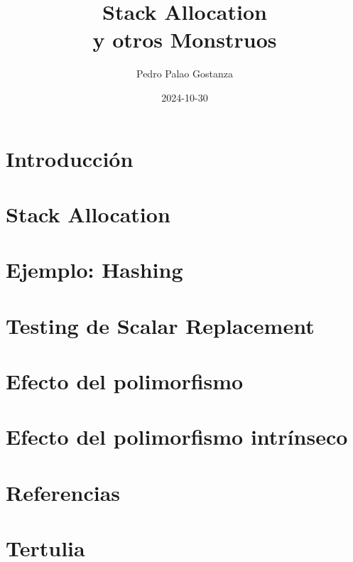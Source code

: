 \documentclass{beamer}
\title[Stack Allocation]{Stack Allocation\\y otros Monstruos}
\author[Pedro]{
  Pedro Palao Gostanza
}
\institute{Seismo Technologies}
\date{2024-10-30}
\begin{document}
\maketitle

\section{Introducción}


\section{Stack Allocation}


\section{Ejemplo: Hashing}


\section{Testing de Scalar Replacement}


\section{Efecto del polimorfismo}


\section{Efecto del polimorfismo intrínseco}


\section{Referencias}


\section{Tertulia}

\end{document}

